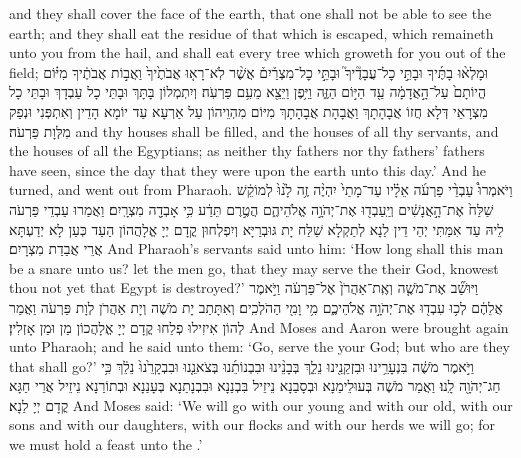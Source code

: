{and they shall cover the face of the earth, that one shall not be able to see the earth; and they shall eat the residue of that which is escaped, which remaineth unto you from the hail, and shall eat every tree which groweth for you out of the field;}{}
{וּמָלְא֨וּ בָתֶּ֜יךָ וּבָתֵּ֣י כׇל־עֲבָדֶ֘יךָ֮ וּבָתֵּ֣י כׇל־מִצְרַ֒יִם֒ אֲשֶׁ֨ר לֹֽא־רָא֤וּ אֲבֹתֶ֙יךָ֙ וַאֲב֣וֹת אֲבֹתֶ֔יךָ מִיּ֗וֹם הֱיוֹתָם֙ עַל־הָ֣אֲדָמָ֔ה עַ֖ד הַיּ֣וֹם הַזֶּ֑ה וַיִּ֥פֶן וַיֵּצֵ֖א מֵעִ֥ם פַּרְעֹֽה׃}
{וְיִתְמְלוֹן בָּתָּךְ וּבָתֵּי כָל עַבְדָךְ וּבָתֵּי כָל מִצְרָאֵי דְּלָא חֲזוֹ אֲבָהָתָךְ וַאֲבָהָת אֲבָהָתָךְ מִיּוֹם מִהְוֵיהוֹן עַל אַרְעָא עַד יוֹמָא הָדֵין וְאִתְפְּנִי וּנְפַק מִלְּוָת פַּרְעֹה׃}
{and thy houses shall be filled, and the houses of all thy servants, and the houses of all the Egyptians; as neither thy fathers nor thy fathers’ fathers have seen, since the day that they were upon the earth unto this day.’ And he turned, and went out from Pharaoh.}{}
{וַיֹּאמְרוּ֩ עַבְדֵ֨י פַרְעֹ֜ה אֵלָ֗יו עַד־מָתַי֙ יִהְיֶ֨ה זֶ֥ה לָ֙נוּ֙ לְמוֹקֵ֔שׁ שַׁלַּח֙ אֶת־הָ֣אֲנָשִׁ֔ים וְיַֽעַבְד֖וּ אֶת־יְהֹוָ֣ה אֱלֹהֵיהֶ֑ם הֲטֶ֣רֶם תֵּדַ֔ע כִּ֥י אָבְדָ֖ה מִצְרָֽיִם׃
}
{וַאֲמַרוּ עַבְדֵי פַּרְעֹה לֵיהּ עַד אִמַּתִּי יְהֵי דֵין לַנָא לְתַקְלָא שַׁלַּח יָת גּוּבְרַיָּא וְיִפְלְחוּן קֳדָם יְיָ אֱלָהֲהוֹן הַעַד כְּעַן לָא יְדַעְתָּא אֲרֵי אֲבַדַת מִצְרָיִם׃}
{And Pharaoh’s servants said unto him: ‘How long shall this man be a snare unto us? let the men go, that they may serve the \lord\space their God, knowest thou not yet that Egypt is destroyed?’}{}
{וַיּוּשַׁ֞ב אֶת־מֹשֶׁ֤ה וְאֶֽת־אַהֲרֹן֙ אֶל־פַּרְעֹ֔ה וַיֹּ֣אמֶר אֲלֵהֶ֔ם לְכ֥וּ עִבְד֖וּ אֶת־יְהֹוָ֣ה אֱלֹהֵיכֶ֑ם מִ֥י וָמִ֖י הַהֹלְכִֽים׃
}
{וְאִתָּתַב יָת מֹשֶׁה וְיָת אַהֲרֹן לְוָת פַּרְעֹה וַאֲמַר לְהוֹן אִיזִילוּ פְלַחוּ קֳדָם יְיָ אֱלָהֲכוֹן מַן וּמַן אָזְלִין׃}
{And Moses and Aaron were brought again unto Pharaoh; and he said unto them: ‘Go, serve the \lord\space your God; but who are they that shall go?’}{}
{וַיֹּ֣אמֶר מֹשֶׁ֔ה בִּנְעָרֵ֥ינוּ וּבִזְקֵנֵ֖ינוּ נֵלֵ֑ךְ בְּבָנֵ֨ינוּ וּבִבְנוֹתֵ֜נוּ בְּצֹאנֵ֤נוּ וּבִבְקָרֵ֙נוּ֙ נֵלֵ֔ךְ כִּ֥י חַג־יְהֹוָ֖ה לָֽנוּ׃}
{וַאֲמַר מֹשֶׁה בְּעוּלֵימַנָא וּבְסָבַנָא נֵיזֵיל בִּבְנַנָא וּבִבְנָתַנָא בְּעָנַנָא וּבְתוֹרַנָא נֵיזֵיל אֲרֵי חַגָּא קֳדָם יְיָ לַנָא׃}
{And Moses said: ‘We will go with our young and with our old, with our sons and with our daughters, with our flocks and with our herds we will go; for we must hold a feast unto the \lord.’}{}
